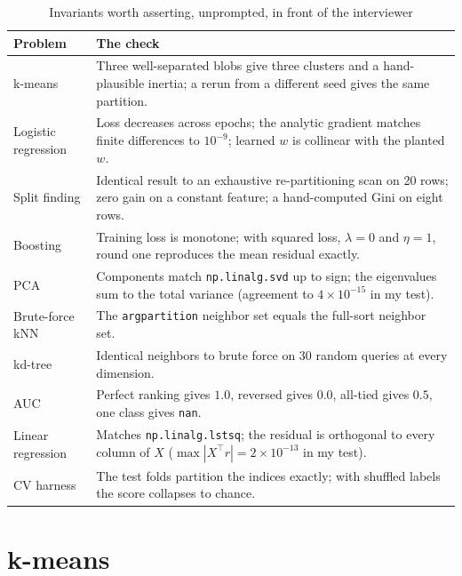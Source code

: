 \begin{table}[H]\centering
\caption{Invariants worth asserting, unprompted, in front of the interviewer}
\label{cml:tab:canon_tests}
\small
\begin{tabular}{p{3.4cm}p{10.2cm}}
\toprule
\textbf{Problem} & \textbf{The check} \\
\midrule
k-means & Three well-separated blobs give three clusters and a hand-plausible inertia; a rerun from a different seed gives the same partition. \\
Logistic regression & Loss decreases across epochs; the analytic gradient matches finite differences to $10^{-9}$; learned $w$ is collinear with the planted $w$. \\
Split finding & Identical result to an exhaustive re-partitioning scan on 20 rows; zero gain on a constant feature; a hand-computed Gini on eight rows. \\
Boosting & Training loss is monotone; with squared loss, $\lambda=0$ and $\eta=1$, round one reproduces the mean residual exactly. \\
PCA & Components match \texttt{np.linalg.svd} up to sign; the eigenvalues sum to the total variance (agreement to $4\times10^{-15}$ in my test). \\
Brute-force kNN & The \texttt{argpartition} neighbor set equals the full-sort neighbor set. \\
kd-tree & Identical neighbors to brute force on 30 random queries at every dimension. \\
AUC & Perfect ranking gives $1.0$, reversed gives $0.0$, all-tied gives $0.5$, one class gives \texttt{nan}. \\
Linear regression & Matches \texttt{np.linalg.lstsq}; the residual is orthogonal to every column of $X$ ($\max |X^\top r| = 2\times10^{-13}$ in my test). \\
CV harness & The test folds partition the indices exactly; with shuffled labels the score collapses to chance. \\
\bottomrule
\end{tabular}
\end{table}

\section{k-means}
\label{cml:sec:canon_kmeans}

